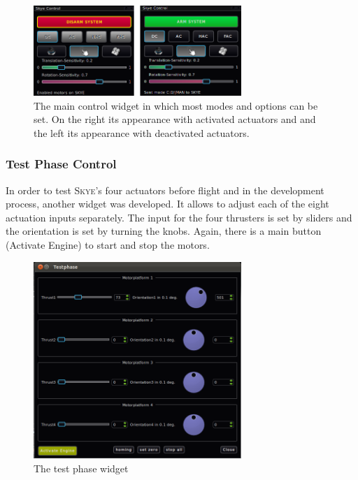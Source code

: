 \begin{figure}[H] %
	\begin{center}
		\includegraphics[width=0.7\textwidth]{qgc_skye_control}
		\caption{The main control widget in which most modes and options can be set. On the right its appearance with activated actuators and and the left its appearance with deactivated actuators.}
		\label{fig:qgc_skye_control}		
	\end{center}
\end{figure}



\subsubsection{Test Phase Control}
In order to test \textsc{Skye}'s four actuators before flight and in the development process, another widget was developed. It allows to adjust each of the eight actuation inputs separately. The input for the four thrusters is set by sliders and the orientation is set by turning the knobs. Again, there is a main button (Activate Engine) to start and stop the motors.

\begin{figure}[H] %
	\begin{center}
		\includegraphics[width=0.7\textwidth]{qgc_test_phase}
		\caption{The test phase widget }  
		\label{figure:qgc_test_phase}
	\end{center}
\end{figure}


